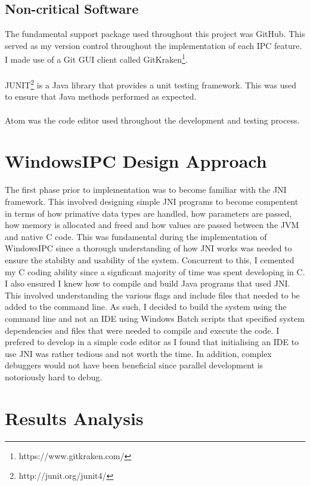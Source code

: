 \documentclass[12pt] {newrucsthesis}    %
\begin{document}
        \subsection{Non-critical Software}
          The fundamental support package used throughout this project was GitHub. This served
          as my version control throughout the implementation of each IPC feature. I made use
          of a Git GUI client called GitKraken\footnote{https://www.gitkraken.com/}.
          \\\\
          JUNIT\footnote{http://junit.org/junit4/} is a Java library that provides a unit testing framework. This
          was used to ensure that Java methods performed as expected.
          \\\\
          Atom was the code editor used throughout the development and testing process.

    \section{WindowsIPC Design Approach} \label{devapproach}
      The first phase prior to implementation was to become familiar with
      the JNI framework. This involved designing simple JNI programs to become compentent
      in terms of how primative data types are handled, how parameters are passed, how memory is
      allocated and freed and how values are passed between the JVM and native C code. This was fundamental
      during the implementation of WindowsIPC since a thorough understanding of how JNI works was needed
      to ensure the stability and usability of the system. Concurrent to this, I cemented my C coding ability since
      a signficant majority of time was spent developing in C. I also ensured I knew how to compile and build Java programs
      that used JNI. This involved understanding the various flags and include files that needed to be added to the command line.
      As such, I decided to build the system using the command line and not an IDE using Windows Batch scripts that
      specified system dependencies and files that were needed to compile and execute the code. I prefered to develop in a
      simple code editor as I found that initialising an IDE to use JNI was rather tedious and not worth the time. In addition,
      complex debuggers would not have been beneficial since parallel development is notoriously hard to debug. 
    \section{Results Analysis} \label{results}
\end{document}
